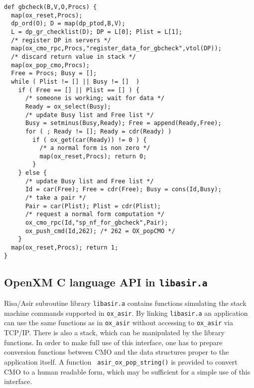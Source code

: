 \documentclass[runningheads]{cl2emult}
\begin{document}
\begin{verbatim}
def gbcheck(B,V,O,Procs) {
  map(ox_reset,Procs);
  dp_ord(O); D = map(dp_ptod,B,V);  
  L = dp_gr_checklist(D); DP = L[0]; Plist = L[1];
  /* register DP in servers */
  map(ox_cmo_rpc,Procs,"register_data_for_gbcheck",vtol(DP));
  /* discard return value in stack */
  map(ox_pop_cmo,Procs);
  Free = Procs; Busy = [];
  while ( Plist != [] || Busy != []  )
    if ( Free == [] || Plist == [] ) {
      /* someone is working; wait for data */
      Ready = ox_select(Busy);
	  /* update Busy list and Free list */
      Busy = setminus(Busy,Ready); Free = append(Ready,Free);
      for ( ; Ready != []; Ready = cdr(Ready) )
        if ( ox_get(car(Ready)) != 0 ) {
		  /* a normal form is non zero */
          map(ox_reset,Procs); return 0;
        }
    } else {
	  /* update Busy list and Free list */
      Id = car(Free); Free = cdr(Free); Busy = cons(Id,Busy);
	  /* take a pair */
	  Pair = car(Plist); Plist = cdr(Plist);
	  /* request a normal form computation */
      ox_cmo_rpc(Id,"sp_nf_for_gbcheck",Pair);
      ox_push_cmd(Id,262); /* 262 = OX_popCMO */
    }
  map(ox_reset,Procs); return 1;
}
\end{verbatim}

\subsection{OpenXM C language API in {\tt libasir.a}}

Risa/Asir subroutine library {\tt libasir.a} contains functions
simulating the stack machine commands supported in {\tt ox\_asir}.  By
linking {\tt libasir.a} an application can use the same functions as
in {\tt ox\_asir} without accessing to {\tt ox\_asir} via
TCP/IP. There is also a stack, which can be manipulated by the library
functions. In order to make full use of this interface, one has to
prepare conversion functions between CMO and the data structures
proper to the application itself.  A function {\tt
asir\_ox\_pop\_string()} is provided to convert CMO to a human
readable form, which may be sufficient for a simple use of this
interface.
\end{document}
